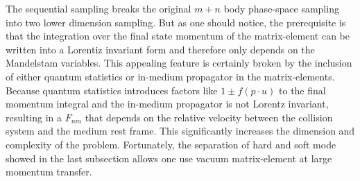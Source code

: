 The sequential sampling breaks the original $m+n$ body phase-space sampling into two lower dimension sampling.
But as one should notice, the prerequisite is that the integration over the final state momentum of the matrix-element can be written into a Lorentiz invariant form and therefore only depends on the Mandelstam variables.
This appealing feature is certainly broken by the inclusion of either
quantum statistics or in-medium propagator in the matrix-elements. 
Because quantum statistics introduces factors like $1\pm f(p\cdot u)$ to the final momentum integral and the in-medium propagator is not Lorentz invariant, resulting in a $F_{nm}$ that depends on the relative velocity between the collision system and the medium rest frame.
This significantly increases the dimension and complexity of the problem. 
Fortunately, the separation of hard and soft mode showed in the last subsection allows one use vacuum matrix-element at large momentum transfer. 

